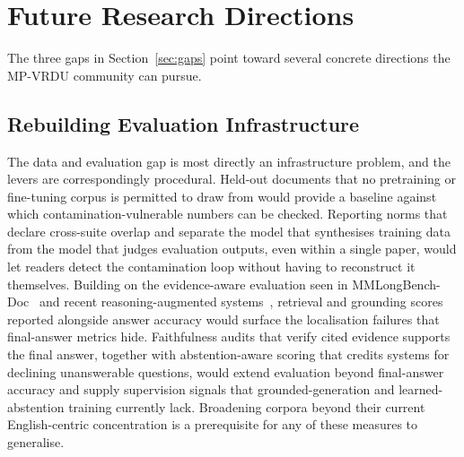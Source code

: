 \documentclass[11pt]{article}
\begin{document}
\section{Future Research Directions}
\label{sec:future}
The three gaps in Section~\ref{sec:gaps} point toward several concrete directions the MP-VRDU community can pursue.

\subsection{Rebuilding Evaluation Infrastructure}
The data and evaluation gap is most directly an infrastructure problem, and the levers are correspondingly procedural. Held-out documents that no pretraining or fine-tuning corpus is permitted to draw from would provide a baseline against which contamination-vulnerable numbers can be checked. Reporting norms that declare cross-suite overlap and separate the model that synthesises training data from the model that judges evaluation outputs, even within a single paper, would let readers detect the contamination loop without having to reconstruct it themselves. Building on the evidence-aware evaluation seen in MMLongBench-Doc~\cite{ma2024mmlongbenchdoc} and recent reasoning-augmented systems~\cite{xiong2026docr1,zhu2025doclens}, retrieval and grounding scores reported alongside answer accuracy would surface the localisation failures that final-answer metrics hide. Faithfulness audits that verify cited evidence supports the final answer, together with abstention-aware scoring that credits systems for declining unanswerable questions, would extend evaluation beyond final-answer accuracy and supply supervision signals that grounded-generation and learned-abstention training currently lack. Broadening corpora beyond their current English-centric concentration is a prerequisite for any of these measures to generalise.
\end{document}
